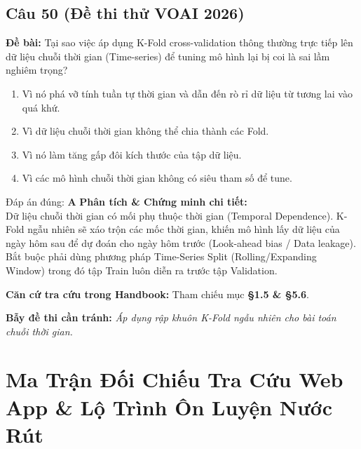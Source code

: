 \documentclass[10pt,a4paper]{article}
\begin{document}
\subsection*{Câu 50 (Đề thi thử VOAI 2026)}
\textbf{Đề bài:} Tại sao việc áp dụng K-Fold cross-validation thông thường trực tiếp lên dữ liệu chuỗi thời gian (Time-series) để tuning mô hình lại bị coi là sai lầm nghiêm trọng?

\begin{enumerate}[label=\textbf{\Alph*.}]
    \item Vì nó phá vỡ tính tuần tự thời gian và dẫn đến rò rỉ dữ liệu từ tương lai vào quá khứ.
    \item Vì dữ liệu chuỗi thời gian không thể chia thành các Fold.
    \item Vì nó làm tăng gấp đôi kích thước của tập dữ liệu.
    \item Vì các mô hình chuỗi thời gian không có siêu tham số để tune.
\end{enumerate}

\begin{solbox}{Đáp án đúng: \textbf{A}}
\textbf{Phân tích \& Chứng minh chi tiết:} \\
Dữ liệu chuỗi thời gian có mối phụ thuộc thời gian (Temporal Dependence). K-Fold ngẫu nhiên sẽ xáo trộn các mốc thời gian, khiến mô hình lấy dữ liệu của ngày hôm sau để dự đoán cho ngày hôm trước (Look-ahead bias / Data leakage). Bắt buộc phải dùng phương pháp Time-Series Split (Rolling/Expanding Window) trong đó tập Train luôn diễn ra trước tập Validation.

\vspace{0.4em}
\textbf{Căn cứ tra cứu trong Handbook:} Tham chiếu mục \textbf{§1.5 \& §5.6}.

\vspace{0.4em}
\textbf{Bẫy đề thi cần tránh:} \textit{Áp dụng rập khuôn K-Fold ngẫu nhiên cho bài toán chuỗi thời gian.}
\end{solbox}
\vspace{0.5em}


\newpage
\section{Ma Trận Đối Chiếu Tra Cứu Web App \& Lộ Trình Ôn Luyện Nước Rút}
\end{document}
